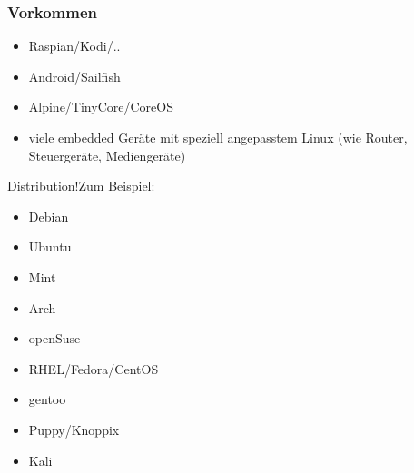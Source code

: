 \begin{frame}
 \frametitle{Vorkommen}

 \begin{itemize}
  \item Raspian/Kodi/..
  \item Android/Sailfish
  \item Alpine/TinyCore/CoreOS
  \item viele embedded Geräte mit speziell angepasstem Linux
 (wie Router, Steuergeräte, Mediengeräte)
 \end{itemize}

\end{frame}



\begin{frame}{Distribution!}{Zum Beispiel:}
\begin{itemize}%
\item Debian
\item Ubuntu
\item Mint
\item Arch
\item openSuse
\item RHEL/Fedora/CentOS 
\item gentoo
\item Puppy/Knoppix 

\item Kali 

\end{itemize}
\end{frame}

